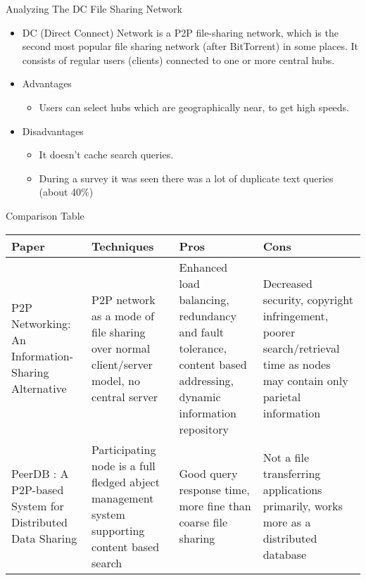 \documentclass[9pt]{beamer}
\begin{document}
\begin{frame}{Analyzing The DC File Sharing Network}
    \begin{itemize}
        \item DC (Direct Connect) Network is a P2P file-sharing network, which is the second most popular file sharing network (after BitTorrent) in some places. It consists of regular users (clients) connected to one or more central hubs.
        \item Advantages
        \begin{itemize}
            \item Users can select hubs which are geographically near, to get high speeds.
        \end{itemize}
        \item Disadvantages
        \begin{itemize}
            \item It doesn’t cache search queries.
            \item During a survey it was seen there was a lot of duplicate text queries (about 40\%)
        \end{itemize}
    \end{itemize}
\end{frame}

\begin{frame}{Comparison Table}
    \begin{tabularx}{1.0\textwidth} { 
        | >{\centering\arraybackslash}X
        | >{\centering\arraybackslash}X
        | >{\centering\arraybackslash}X
        | >{\centering\arraybackslash}X | }
        \hline Paper & Techniques & Pros & Cons \\
        \hline P2P Networking: An Information-Sharing Alternative & P2P network as a mode of file sharing over normal client/server model, no central server & Enhanced load balancing, redundancy and fault tolerance, content based addressing, dynamic information repository & Decreased security, copyright infringement, poorer search/retrieval time as nodes may contain only parietal information \\
        \hline PeerDB : A P2P-based System for Distributed Data Sharing & Participating node is a full fledged abject management system supporting content based search  & Good query response time, more fine than coarse file sharing & Not a file transferring applications primarily, works more as a distributed database \\
        \hline
    \end{tabularx}
\end{frame}
\end{document}
